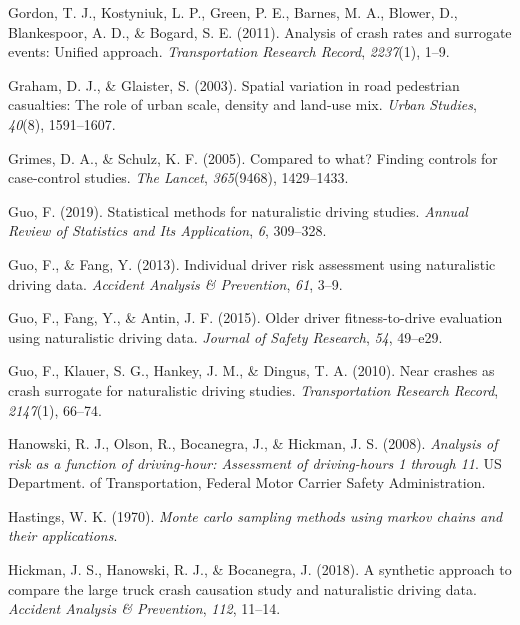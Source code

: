 \documentclass[12pt]{book}
\numberwithin{equation}{chapter}
\begin{document}
\leavevmode\hypertarget{ref-gordon2011analysis}{}%
Gordon, T. J., Kostyniuk, L. P., Green, P. E., Barnes, M. A., Blower, D., Blankespoor, A. D., \& Bogard, S. E. (2011). Analysis of crash rates and surrogate events: Unified approach. \emph{Transportation Research Record}, \emph{2237}(1), 1--9.

\leavevmode\hypertarget{ref-graham2003spatial}{}%
Graham, D. J., \& Glaister, S. (2003). Spatial variation in road pedestrian casualties: The role of urban scale, density and land-use mix. \emph{Urban Studies}, \emph{40}(8), 1591--1607.

\leavevmode\hypertarget{ref-grimes2005compared}{}%
Grimes, D. A., \& Schulz, K. F. (2005). Compared to what? Finding controls for case-control studies. \emph{The Lancet}, \emph{365}(9468), 1429--1433.

\leavevmode\hypertarget{ref-guo2019statistical}{}%
Guo, F. (2019). Statistical methods for naturalistic driving studies. \emph{Annual Review of Statistics and Its Application}, \emph{6}, 309--328.

\leavevmode\hypertarget{ref-guo2013individual}{}%
Guo, F., \& Fang, Y. (2013). Individual driver risk assessment using naturalistic driving data. \emph{Accident Analysis \& Prevention}, \emph{61}, 3--9.

\leavevmode\hypertarget{ref-guo2015older}{}%
Guo, F., Fang, Y., \& Antin, J. F. (2015). Older driver fitness-to-drive evaluation using naturalistic driving data. \emph{Journal of Safety Research}, \emph{54}, 49--e29.

\leavevmode\hypertarget{ref-guo2010near}{}%
Guo, F., Klauer, S. G., Hankey, J. M., \& Dingus, T. A. (2010). Near crashes as crash surrogate for naturalistic driving studies. \emph{Transportation Research Record}, \emph{2147}(1), 66--74.

\leavevmode\hypertarget{ref-hanowski2008analysis}{}%
Hanowski, R. J., Olson, R., Bocanegra, J., \& Hickman, J. S. (2008). \emph{Analysis of risk as a function of driving-hour: Assessment of driving-hours 1 through 11}. US Department. of Transportation, Federal Motor Carrier Safety Administration.

\leavevmode\hypertarget{ref-hastings1970monte}{}%
Hastings, W. K. (1970). \emph{Monte carlo sampling methods using markov chains and their applications}.

\leavevmode\hypertarget{ref-hickman2018synthetic}{}%
Hickman, J. S., Hanowski, R. J., \& Bocanegra, J. (2018). A synthetic approach to compare the large truck crash causation study and naturalistic driving data. \emph{Accident Analysis \& Prevention}, \emph{112}, 11--14.
\end{document}
